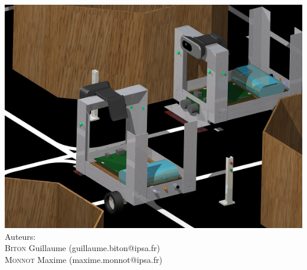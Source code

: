 \begin{titlepage}
 \includegraphics[scale=0.4]{Graphics/illustration2.png}\\[2.75cm]

{\normalsize Auteurs:}\\
\small
\textsc{Biton} Guillaume (guillaume.biton@ipsa.fr)\\
\textsc{Monnot} Maxime \small(maxime.monnot@ipsa.fr)\\[1cm]

 

\vfill %

\restoregeometry

\end{titlepage}